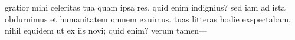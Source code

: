 


 gratior mihi celeritas tua quam ipsa res. quid enim indignius? sed iam ad ista obduruimus et humanitatem omnem exuimus. tuas litteras hodie exspectabam, nihil equidem ut ex iis novi; quid enim? verum tamen—
